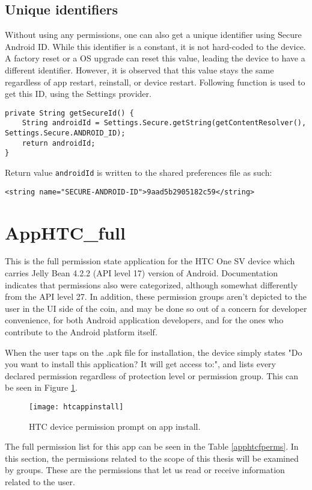 \documentclass[
  a4paper,  %
  twoside,  %
  bibliography=totoc,
  headsepline,
  cleardoublepage=empty,
  parskip=half,
  draft=false,
  open=any
]{scrbook}
\begin{document}
\subsection{Unique identifiers}
Without using any permissions, one can also get a unique identifier using Secure Android ID. While this identifier is a constant, it is not hard-coded to the device. A factory reset or a OS upgrade can reset this value, leading the device to have a different identifier. However, it is observed that this value stays the same regardless of app restart, reinstall, or device restart. Following function is used to get this ID, using the Settings provider.
\begin{lstlisting}
private String getSecureId() {
	String androidId = Settings.Secure.getString(getContentResolver(), Settings.Secure.ANDROID_ID);
	return androidId;
}
\end{lstlisting}
Return value \texttt{androidId} is written to the shared preferences file as such:
\begin{lstlisting}
<string name="SECURE-ANDROID-ID">9aad5b2905182c59</string>
\end{lstlisting}

\section{AppHTC\_full}
This is the full permission state application for the HTC One SV device which carries Jelly Bean 4.2.2 (API level 17) version of Android. Documentation indicates that permissions also were categorized, although somewhat differently from the API level 27. In addition, these permission groups aren't depicted to the user in the UI side of the coin, and may be done so out of a concern for developer convenience, for both Android application developers, and for the ones who contribute to the Android platform itself. 

When the user taps on the .apk file for installation, the device simply states "Do you want to install this application? It will get access to:", and lists every declared permission regardless of protection level or permission group. This can be seen in Figure \ref{htcappinstall}.
\begin{figure}\centering
	\texttt{[image: htcappinstall]}
	\caption{HTC device permission prompt on app install.}
	\label{htcappinstall}
\end{figure}

The full permission list for this app can be seen in the Table \ref{apphtcfperms}. In this section, the permissions related to the scope of this thesis will be examined by groups. These are the permissions that let us read or receive information related to the user.
\end{document}
